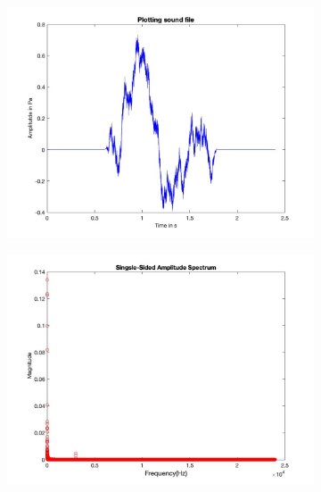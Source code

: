 \documentclass[
	a4paper,
	11pt,
]{article}
\begin{document}
\begin{figure}
  \centering 
  \begin{subfigure}[t]{0.45\textwidth}
    \centering
    \includegraphics[width=\linewidth]{A1/image1.jpg}
    \label{fig:sub1}
    \caption{}
  \end{subfigure}
  \hfill
  \begin{subfigure}[t]{0.45\textwidth}
    \centering
    \includegraphics[width=\linewidth]{A1/image2.jpg}
    \caption{}
    \label{fig:sub2}
  \end{subfigure}
  \bigskip
  \begin{subfigure}[t]{0.45\textwidth}
    \centering

\end{subfigure}
\end{figure}
\end{document}
